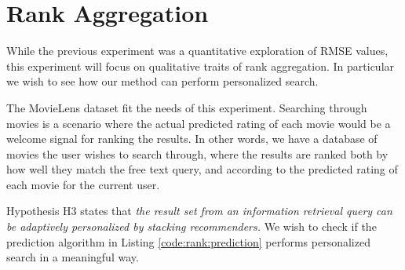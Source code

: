 \section{Rank Aggregation}


\afterpage{\clearpage}

While the previous experiment was a quantitative exploration of RMSE values,
this experiment will focus on qualitative traits of rank aggregation.
In particular we wish to see how our method can perform personalized search.

The MovieLens dataset fit the needs of this experiment.
Searching through movies is a scenario where the actual predicted
rating of each movie would be a welcome signal for ranking the results.
In other words, we have a database of movies the user wishes to search through,
where the results are ranked both by how well they match the free text query,
and according to the predicted rating of each movie for the current user.

Hypothesis H3 states that 
{
  \itshape
  the result set from an information retrieval query
  can be adaptively personalized by stacking recommenders.
}
We wish to check if the prediction algorithm
in Listing \ref{code:rank:prediction} performs personalized search
in a meaningful way.

\begin{comment}
\begin{table}[b]
  \centering
  \begin{tabular*}{0.7\textwidth}{ l l l l }
    \toprule
      ~ & 
      \emph{query} &
      \emph{scores} &
      \emph{IR weight} \\
    \midrule
    
    1 &
    ["new york or washington"] &
    combined &
    $1.0$ \\

    2 &
    [star trek] &
    combined &
    $0.3$ \\

    3 &
    [paris] &
    ratings &
    $0.0$ \\

    4 &
    [1998] &
    ratings &
    $0.0$ \\

    \bottomrule 
  \end{tabular*}
  \caption[List of Ranking Experiments]{List of ranking tests in this section.}
  \label{table:experiments:rank}
\end{table}
\end{comment}

